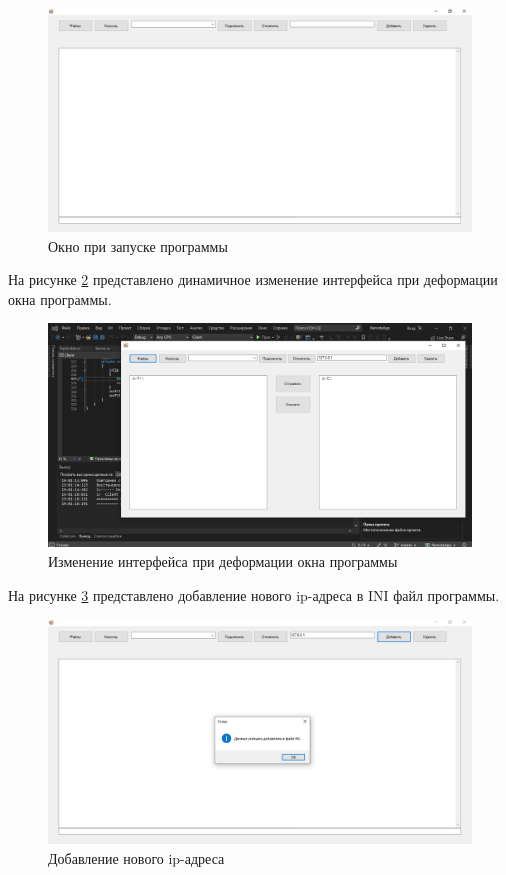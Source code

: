 \begin{figure}
	\centering
	\includegraphics[width=1\linewidth]{"images/1"}
	\caption{Окно при запуске программы}
	\label{1:image}
\end{figure}

На рисунке \ref{2:image} представлено динамичное изменение интерфейса при деформации окна программы.

\begin{figure}
	\centering
	\includegraphics[width=1\linewidth]{"images/2"}
	\caption{Изменение интерфейса при деформации окна программы}
	\label{2:image}
\end{figure}

На рисунке \ref{3:image} представлено добавление нового ip-адреса в INI файл программы.

\begin{figure}
	\centering
	\includegraphics[width=1\linewidth]{"images/3"}
	\caption{Добавление нового ip-адреса}
	\label{3:image}
\end{figure}

